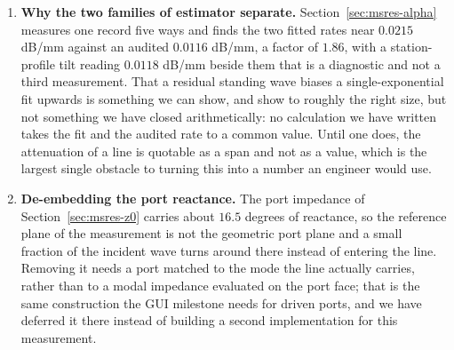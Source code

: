 \begin{enumerate}[leftmargin=1.6em,itemsep=3pt]
        $-50$ dB at normal incidence in two dimensions, so the staging this list used to carry -- absorbing more
        than $20$ dB, and then more than $40$ dB -- is met. What is open is everything the measurement does not
        cover. Oblique and grazing incidence is where a one-way condition first-order in $h$ is weakest, and it is
        unmeasured. A broadband or low-frequency incident field is not represented at all by a condition that
        assumes a single propagating speed. And the floor left at normal incidence is the interior's dispersion
        rather than the boundary's: it sits at $|v_{\mathrm{ph}}-c_0|/(2c_0)$ and can only be lowered by refining
        the mesh, so on a coarse grid no absorbing condition can beat it. The layer of Section~\ref{sec:res-pml}
        lowers the floor but does not settle the rest: it too has been measured at normal incidence only, so
        oblique and grazing incidence, and fields whose spectrum reaches down to where the layer is a fraction of
        a wavelength thick, remain unmeasured for it as well.
  \item \textbf{Why the two families of estimator separate.} Section~\ref{sec:msres-alpha} measures one record five
        ways and finds the two fitted rates near $0.0215$ dB/mm against an audited $0.0116$ dB/mm, a factor of
        $1.86$, with a station-profile tilt reading $0.0118$ dB/mm beside them that is a diagnostic and not a
        third measurement. That a residual standing wave biases a single-exponential fit upwards is something we
        can show, and show to roughly the right size, but not something we have closed arithmetically: no
        calculation we have written takes the fit and the audited rate to a common value. Until one does, the
        attenuation of a line is quotable as a span and not as a value, which is the largest single obstacle to
        turning this into a number an engineer would use.
  \item \textbf{De-embedding the port reactance.} The port impedance of Section~\ref{sec:msres-z0} carries about
        $16.5$ degrees of reactance, so the reference plane of the measurement is not the geometric port plane and
        a small fraction of the incident wave turns around there instead of entering the line. Removing it needs a
        port matched to the mode the line actually carries, rather than to a modal impedance evaluated on the port
        face; that is the same construction the GUI milestone needs for driven ports, and we have deferred it
        there instead of building a second implementation for this measurement.

\end{enumerate}
